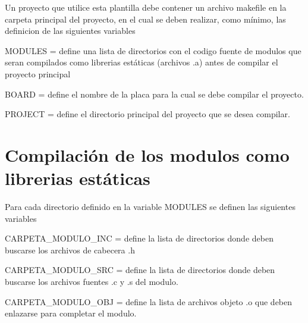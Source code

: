 Un proyecto que utilice esta plantilla debe contener un archivo {\ttfamily makefile} en la carpeta principal del proyecto, en el cual se deben realizar, como mínimo, las definicion de las siguientes variables

{\ttfamily M\+O\+D\+U\+L\+ES} = define una lista de directorios con el codigo fuente de modulos que seran compilados como librerias estáticas (archivos {\ttfamily .a}) antes de compilar el proyecto principal

{\ttfamily B\+O\+A\+RD} = define el nombre de la placa para la cual se debe compilar el proyecto.

{\ttfamily P\+R\+O\+J\+E\+CT} = define el directorio principal del proyecto que se desea compilar.

\section*{Compilación de los modulos como librerias estáticas}

Para cada directorio definido en la variable {\ttfamily M\+O\+D\+U\+L\+ES} se definen las siguientes variables

{\ttfamily C\+A\+R\+P\+E\+T\+A\+\_\+\+M\+O\+D\+U\+L\+O\+\_\+\+I\+NC} = define la lista de directorios donde deben buscarse los archivos de cabecera {\ttfamily .h}

{\ttfamily C\+A\+R\+P\+E\+T\+A\+\_\+\+M\+O\+D\+U\+L\+O\+\_\+\+S\+RC} = define la lista de directorios donde deben buscarse los archivos fuentes {\ttfamily .c} y {\ttfamily .s} del modulo.

{\ttfamily C\+A\+R\+P\+E\+T\+A\+\_\+\+M\+O\+D\+U\+L\+O\+\_\+\+O\+BJ} = define la lista de archivos objeto {\ttfamily .o} que deben enlazarse para completar el modulo. 